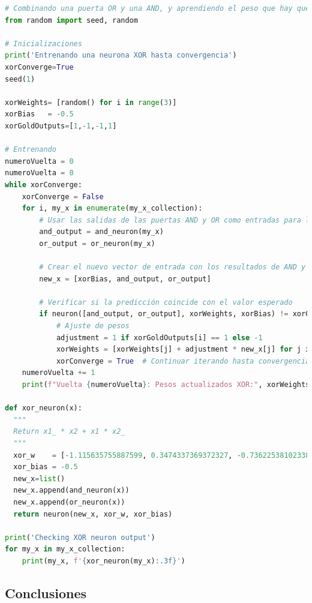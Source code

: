 \documentclass{report}
\begin{document}
        \clearpage
        \begin{lstlisting}[language=Python, caption=Implementación del perceptron para las puerta lógica XOR]
# Combinando una puerta OR y una AND, y aprendiendo el peso que hay que darle a cada una para obtener un XOR 
from random import seed, random

# Inicializaciones
print('Entrenando una neurona XOR hasta convergencia')
xorConverge=True
seed(1)

xorWeights= [random() for i in range(3)]
xorBias   = -0.5
xorGoldOutputs=[1,-1,-1,1]

# Entrenando
numeroVuelta = 0
numeroVuelta = 0
while xorConverge:
    xorConverge = False
    for i, my_x in enumerate(my_x_collection):
        # Usar las salidas de las puertas AND y OR como entradas para la XOR
        and_output = and_neuron(my_x)
        or_output = or_neuron(my_x)
        
        # Crear el nuevo vector de entrada con los resultados de AND y OR
        new_x = [xorBias, and_output, or_output]
        
        # Verificar si la predicción coincide con el valor esperado
        if neuron([and_output, or_output], xorWeights, xorBias) != xorGoldOutputs[i]:
            # Ajuste de pesos
            adjustment = 1 if xorGoldOutputs[i] == 1 else -1
            xorWeights = [xorWeights[j] + adjustment * new_x[j] for j in range(len(xorWeights))]
            xorConverge = True  # Continuar iterando hasta convergencia
    numeroVuelta += 1
    print(f"Vuelta {numeroVuelta}: Pesos actualizados XOR:", xorWeights)

def xor_neuron(x):
  """
  Return x1_ * x2 + x1 * x2_
  """
  xor_w    = [-1.115635755887599, 0.3474337369372327, -0.7362253810233859]
  xor_bias = -0.5
  new_x=list()
  new_x.append(and_neuron(x))
  new_x.append(or_neuron(x))
  return neuron(new_x, xor_w, xor_bias)

print('Checking XOR neuron output')
for my_x in my_x_collection:
    print(my_x, f'{xor_neuron(my_x):.3f}')
        \end{lstlisting}
        \clearpage
      \subsection*{Conclusiones}
\end{document}
